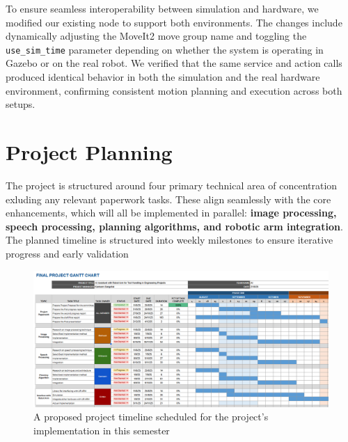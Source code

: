 \documentclass[12pt]{extarticle}
\begin{document}
To ensure seamless interoperability between simulation and hardware, we modified our existing node to support both environments. The changes include dynamically adjusting the MoveIt2 move group name and toggling the \texttt{use\_sim\_time} parameter depending on whether the system is operating in Gazebo or on the real robot. We verified that the same service and action calls produced identical behavior in both the simulation and the real hardware environment, confirming consistent motion planning and execution across both setups.

\newpage
\section{Project Planning}
The project is structured around four primary technical area of concentration exluding any relevant paperwork tasks. These align seamlessly with the core enhancements, which will all be implemented in parallel: \textbf{image processing, speech processing, planning algorithms, and robotic arm integration}.  The planned timeline is structured into weekly milestones to ensure iterative progress and early validation 

\begin{figure}[htbp]
    \centering
    \includegraphics[width=0.8\linewidth]{images/Gantt_chart(2).png}
    \caption{A proposed project timeline scheduled for the project’s implementation in this semester}
    \label{fig:gantt-chart}
\end{figure}
\end{document}
